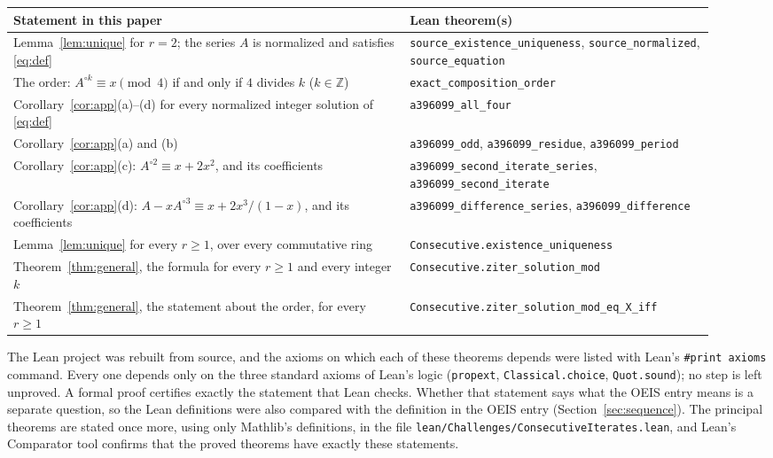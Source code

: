 \documentclass[11pt,a4paper]{article}
\theoremstyle{definition}
\theoremstyle{remark}
\newcommand{\Z}{\mathbb{Z}}
\begin{document}
\begin{center}\small\renewcommand{\arraystretch}{1.25}
\begin{tabular}{>{\raggedright\arraybackslash}p{0.52\linewidth}>{\raggedright\arraybackslash}p{0.4\linewidth}}
\toprule
Statement in this paper & Lean theorem(s)\\
\midrule
Lemma~\ref{lem:unique} for $r=2$; the series $A$ is normalized and satisfies \eqref{eq:def} & \texttt{source\_\allowbreak{}existence\_\allowbreak{}uniqueness}, \texttt{source\_\allowbreak{}normalized}, \texttt{source\_\allowbreak{}equation} \\
The order: $A^{\circ k}\equiv x\pmod4$ if and only if $4$ divides $k$ ($k\in\Z$) & \texttt{exact\_\allowbreak{}composition\_\allowbreak{}order} \\
Corollary~\ref{cor:app}(a)--(d) for every normalized integer solution of \eqref{eq:def} & \texttt{a396099\_\allowbreak{}all\_\allowbreak{}four} \\
Corollary~\ref{cor:app}(a) and (b) & \texttt{a396099\_\allowbreak{}odd}, \texttt{a396099\_\allowbreak{}residue}, \texttt{a396099\_\allowbreak{}period} \\
Corollary~\ref{cor:app}(c): $A^{\circ2}\equiv x+2x^2$, and its coefficients & \texttt{a396099\_\allowbreak{}second\_\allowbreak{}iterate\_\allowbreak{}series}, \texttt{a396099\_\allowbreak{}second\_\allowbreak{}iterate} \\
Corollary~\ref{cor:app}(d): $A-xA^{\circ3}\equiv x+2x^3/(1-x)$, and its coefficients & \texttt{a396099\_\allowbreak{}difference\_\allowbreak{}series}, \texttt{a396099\_\allowbreak{}difference} \\
Lemma~\ref{lem:unique} for every $r\ge1$, over every commutative ring & \texttt{Consecutive.existence\_\allowbreak{}uniqueness} \\
Theorem~\ref{thm:general}, the formula for every $r\ge1$ and every integer $k$ & \texttt{Consecutive.ziter\_\allowbreak{}solution\_\allowbreak{}mod} \\
Theorem~\ref{thm:general}, the statement about the order, for every $r\ge1$ & \texttt{Consecutive.ziter\_\allowbreak{}solution\_\allowbreak{}mod\_\allowbreak{}eq\_\allowbreak{}X\_\allowbreak{}iff} \\
\bottomrule
\end{tabular}
\end{center}
The Lean project was rebuilt from source, and the axioms on which each of these theorems depends were listed with
Lean's \texttt{\#print axioms} command. Every one depends only on the three standard axioms of Lean's logic
(\texttt{propext}, \texttt{Classical.choice}, \texttt{Quot.sound}); no step is left unproved. A formal proof certifies
exactly the statement that Lean checks. Whether that statement says what the OEIS entry means is a separate question,
so the Lean definitions were also compared with the definition in the OEIS entry
(Section~\ref{sec:sequence}). The principal theorems are stated once more, using only Mathlib's definitions, in the
file \texttt{lean/Challenges/ConsecutiveIterates.lean}, and Lean's Comparator tool confirms that the
proved theorems have exactly these statements.
\end{document}
